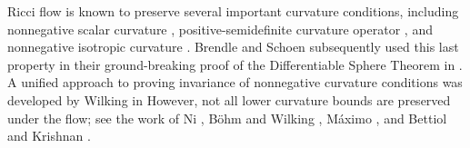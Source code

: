 \documentclass{amsart}
\numberwithin{equation}{section}
\theoremstyle{plain}
\theoremstyle{definition}
\theoremstyle{remark}
\numberwithin{table}{section}
\newcommand{\Sp}{\mathsf{Sp}}
\begin{document}
Ricci flow is known to preserve several important curvature conditions, including nonnegative scalar curvature \cite{Hamilton82}, positive-semidefinite curvature operator \cite{Hamilton86}, and nonnegative isotropic curvature \cite{BrendleSchoen09,Hamilton97,Nguyen10}.
Brendle and Schoen subsequently used this last property in their ground-breaking proof of the Differentiable Sphere Theorem in \cite{BrendleSchoen09}.
A unified approach to proving invariance of nonnegative curvature conditions was developed by Wilking in \cite{Wilking13}
However, not all lower curvature bounds are preserved under the flow; see the work of Ni \cite{Ni04}, B\"ohm and Wilking \cite{BohmWilking07}, M\'aximo \cite{Maximo11,Maximo14}, and Bettiol and Krishnan \cite{BettiolKrishnan19,BettiolKrishnan23}.
\end{document}
